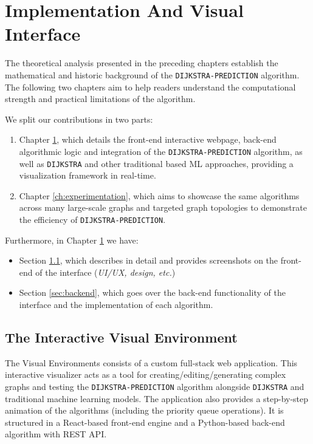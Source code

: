 \chapter{Implementation And Visual Interface}
\label{ch:implementation}

The theoretical analysis presented in the preceding chapters establish the mathematical and historic background of the \texttt{DIJKSTRA-PREDICTION} algorithm. The following two chapters aim to help readers understand the computational strength and practical limitations of the algorithm.

We split our contributions in two parts:
\begin{enumerate}
    \item Chapter \ref{ch:implementation}, which details the front-end interactive webpage, back-end algorithmic logic and integration of the \texttt{DIJKSTRA-PREDICTION} algorithm, as well as \texttt{DIJKSTRA} and other traditional based ML approaches, providing a visualization framework in real-time.
    \item Chapter \ref{ch:experimentation}, which aims to showcase the same algorithms across many large-scale graphs and targeted graph topologies to demonstrate the efficiency of \texttt{DIJKSTRA-PREDICTION}.
\end{enumerate}
Furthermore, in Chapter \ref{ch:implementation} we have:
\begin{itemize}
    \item Section \ref{sec:frontend}, which describes in detail and provides screenshots on the front-end of the interface (\textit{UI/UX, design, etc.})
    \item Section \ref{sec:backend}, which goes over the back-end functionality of the interface and the implementation of each algorithm.
\end{itemize}

\section{The Interactive Visual Environment} \label{sec:frontend}
The Visual Environments consists of a custom full-stack web application. This interactive visualizer acts as a tool for creating/editing/generating complex graphs and testing the \texttt{DIJKSTRA-PREDICTION} algorithm alongside \texttt{DIJKSTRA} and traditional machine learning models. The application also provides a step-by-step animation of the algorithms (including the priority queue operations). It is structured in a React-based front-end engine and a Python-based back-end algorithm with REST API.

